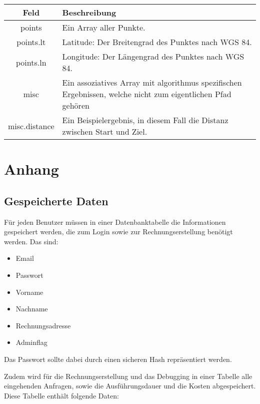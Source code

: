 \documentclass[ngerman]{scrartcl}
\begin{document}
		\begin{tabular}{|c|p{12cm}|}
			\hline
			\textbf{Feld} & \textbf{Beschreibung} \\ 
			\hline \hline
			
			points & Ein Array aller Punkte.\\
			\hline
			
	    	points.lt & Latitude: Der Breitengrad des Punktes nach WGS 84. \\ 
	    	\hline
	    	
	    	points.ln & Longitude: Der Längengrad des Punktes nach WGS 84. \\
	    	\hline
	    	
	    	misc & Ein assoziatives Array mit algorithmus spezifischen Ergebnissen, welche nicht zum eigentlichen Pfad gehören \\
	    	\hline
	    	
	    	misc.distance & Ein Beispielergebnis, in diesem Fall die Distanz zwischen Start und Ziel.\\
	    	\hline
		\end{tabular}
	

\section{Anhang}

	\subsection{Gespeicherte Daten}
	
	Für jeden Benutzer müssen in einer Datenbanktabelle die Informationen gespeichert werden, die zum Login sowie zur Rechnungserstellung benötigt werden. 
	Das sind:
	
	\begin{itemize}
		\item Email
		\item Passwort
		\item Vorname
		\item Nachname
		\item Rechnungsadresse
		\item Adminflag
	\end{itemize}
	
	Das Passwort sollte dabei durch einen sicheren Hash repräsentiert werden.
	
	Zudem wird für die Rechnungserstellung und das Debugging in einer Tabelle alle eingehenden Anfragen, sowie die Ausführungsdauer und die Kosten abgespeichert.
	Diese Tabelle enthält folgende Daten:
	
\end{document}
